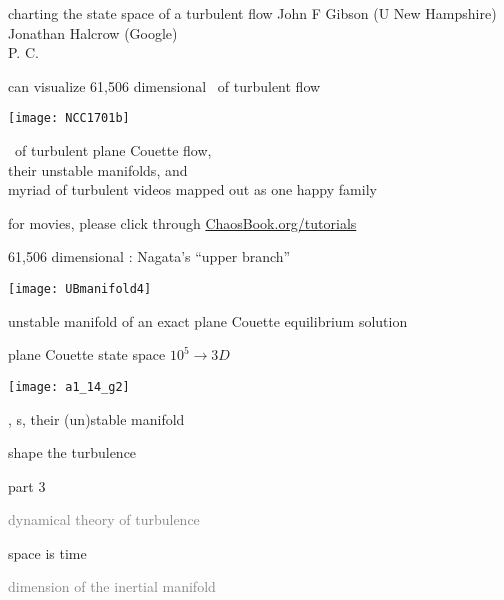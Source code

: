 \begin{frame}{charting the state space of a turbulent flow}
John F Gibson (U New Hampshire)
\\
Jonathan Halcrow (Google)
\\
P. C.
\end{frame}

\begin{frame}{can visualize 61,506 dimensional \statesp\ of turbulent flow}
\begin{center}
\texttt{[image: NCC1701b]}
\end{center}
\eqva\ of turbulent plane Couette flow,
\\
their unstable manifolds, and
\\
myriad of turbulent videos mapped out as one happy family

\bigskip

\hfill   {\small
          for movies, please click through
            \textcolor{blue}{\href{http://ChaosBook.org/tutorials}
             {ChaosBook.org/tutorials}}
          }
\end{frame}

\begin{frame}{61,506 dimensional : Nagata's ``upper branch''}
\begin{center}
\texttt{[image: UBmanifold4]}
\end{center}
unstable manifold of an exact plane Couette equilibrium solution
\end{frame}

\begin{frame}{plane Couette state space $10^5 \to 3D$}
\begin{center}
\texttt{[image: a1\_14\_g2]}
\end{center}
\eqva, \po s, their (un)stable manifold

\hfill   shape the turbulence
\end{frame}

\begin{frame}{part 3}
\begin{enumerate}
              \item
    \textcolor{gray}{\small
dynamical theory of turbulence
              \item
\statesp
        }
              \item
    {\Large
space is time
    }\textcolor{gray}{\small
              \item
dimension of the inertial manifold
                    }
            \end{enumerate}
\end{frame}


